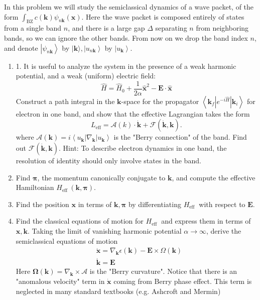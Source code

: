 \documentclass[hyperref, a4paper]{article}
\begin{document}
In this problem we will study the semiclassical dynamics of a wave packet, of the form $\int_{\mathrm{BZ}} c(\mathbf{k}) \psi_{n \mathbf{k}}(\mathbf{x})$. Here the wave packet is composed entirely of states from a single band $n$, and there is a large gap $\Delta$ separating $n$ from neighboring bands, so we can ignore the other bands. From now on we drop the band index $n$, and denote $\left|\psi_{n \mathbf{k}}\right\rangle$ by $|\mathbf{k}\rangle,\left|u_{n \mathbf{k}}\right\rangle$ by $\left|u_{\mathbf{k}}\right\rangle$.
\begin{enumerate}
    \item 1. It is useful to analyze the system in the presence of a weak harmonic potential, and a weak (uniform) electric field:
    $$
    \hat{H}=\hat{H}_0+\frac{1}{2 \alpha} \hat{\mathbf{x}}^2-\mathbf{E} \cdot \hat{\mathbf{x}}
    $$
    Construct a path integral in the $\mathbf{k}$-space for the propagator $\left\langle\mathbf{k}_f\left|e^{-i \hat{H}}\right| \mathbf{k}_i\right\rangle$ for electron in one band, and show that the effective Lagrangian takes the form
    $$
    L_{\mathrm{eff}}=\mathcal{A}(k) \cdot \dot{\mathbf{k}}+\mathcal{F}(\dot{\mathbf{k}}, \mathbf{k}) .
    $$
    where $\mathcal{A}(\mathbf{k})=i\left\langle u_{\mathbf{k}}\left|\nabla_{\mathbf{k}}\right| u_{\mathbf{k}}\right\rangle$ is the "Berry connection" of the band. Find out $\mathcal{F}(\dot{\mathbf{k}}, \mathbf{k})$.
    Hint: To describe electron dynamics in one band, the resolution of identity should only involve states in the band.
    \item Find $\boldsymbol{\pi}$, the momentum canonically conjugate to $\mathbf{k}$, and compute the effective Hamiltonian $H_{\text {eff }}(\mathbf{k}, \boldsymbol{\pi})$.
    \item Find the position $\mathbf{x}$ in terms of $\mathbf{k}, \boldsymbol{\pi}$ by differentiating $H_{\text {eff }}$ with respect to $\mathbf{E}$.
    \item Find the classical equations of motion for $H_{\text {eff }}$ and express them in terms of $\mathbf{x}, \mathbf{k}$. Taking the limit of vanishing harmonic potential $\alpha \rightarrow \infty$, derive the semiclassical equations of motion
    $$
    \begin{aligned}
    &\dot{\mathbf{x}}=\nabla_{\mathbf{k}} \epsilon(\mathbf{k})-\mathbf{E} \times \Omega(\mathbf{k}) \\
    &\dot{\mathbf{k}}=\mathbf{E}
    \end{aligned}
    $$
    Here $\boldsymbol{\Omega}(\mathbf{k})=\nabla_{\mathbf{k}} \times \mathcal{A}$ is the "Berry curvature". Notice that there is an "anomalous velocity" term in $\dot{\mathbf{x}}$ coming from Berry phase effect. This term is neglected in many standard textbooks (e.g. Ashcroft and Mermin)

\end{enumerate}
\end{document}
